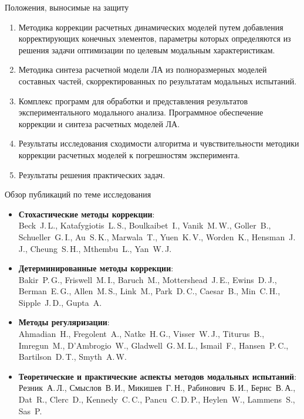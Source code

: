 \begin{frame}{Положения, выносимые на защиту}
	\begin{enumerate}
		\item Методика коррекции расчетных динамических моделей путем добавления корректирующих конечных элементов, параметры которых определяются из решения задачи оптимизации по целевым модальным характеристикам.
		\item Методика синтеза расчетной модели ЛА из полноразмерных моделей составных частей, скорректированных по результатам модальных испытаний.
		\item Комплекс программ для обработки и представления результатов экспериментального модального анализа. Программное обеспечение коррекции и синтеза расчетных моделей ЛА.
		\item Результаты исследования сходимости алгоритма и чувствительности методики коррекции расчетных моделей к погрешностям эксперимента.
		\item Результаты решения практических задач.
	\end{enumerate}
\end{frame}

\begin{frame}{Обзор публикаций по теме исследования}
	\begin{itemize}
		\item \textbf{Стохастические методы коррекции}: \\ Beck~J.\,L., Katafygiotis~L.\,S., Boulkaibet~I., Vanik~M.\,W., Goller~B., Schueller~G.\,I., Au~S.\,K., Marwala~T., Yuen~K.\,V., Worden~K., Hensman~J.\,J., Cheung~S.\,H., Mthembu~L., Yan~W.\,J.
		\item \textbf{Детерминированные методы коррекции}: \\ Bakir~P.\,G., Friswell~M.\,I., Baruch~M., Mottershead~J.\,E., Ewins~D.\,J., Berman~E.\,G., Allen~M.\,S., Link~M., Park~D.\,C., Caesar~B., Min~C.\,H., Sipple~J.\,D., Gupta~A.
		\item \textbf{Методы регуляризации}: \\ Ahmadian~H., Fregolent~A., Natke~H.\,G., Visser~W.\,J., Titurus~B., Imregun~M., D'Ambrogio~W., Gladwell~G.\,M.\,L., Ismail~F., Hansen~P.\,C., Bartilson~D.\,T., Smyth~A.\,W.
		\item \textbf{Теоретические и практические аспекты методов модальных испытаний}: \\ Резник~А.\,Л., Смыслов~В.\,И., Микишев~Г.\,Н., Рабинович~Б.\,И., Бернс~В.\,А., Dat~R., Clerc~D., Kennedy~C.\,C., Pancu~C.\,D.\,P., Heylen~W., Lammens~S., Sas~P.
	\end{itemize}
\end{frame}
